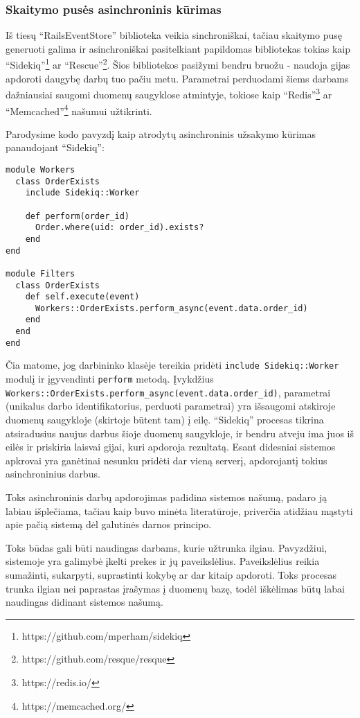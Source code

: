 \subsubsection{Skaitymo pusės asinchroninis kūrimas}

Iš tiesų ``RailsEventStore'' biblioteka veikia sinchroniškai, tačiau skaitymo pusę generuoti galima ir asinchroniškai pasitelkiant papildomas bibliotekas tokias kaip ``Sidekiq''\footnote{https://github.com/mperham/sidekiq} ar ``Rescue''\footnote{https://github.com/resque/resque}. Šios bibliotekos pasižymi bendru bruožu - naudoja gijas apdoroti daugybę darbų tuo pačiu metu. Parametrai perduodami šiems darbams dažniausiai saugomi duomenų saugyklose atmintyje, tokiose kaip ``Redis''\footnote{https://redis.io/} ar ``Memcached''\footnote{https://memcached.org/} našumui užtikrinti.

Parodysime kodo pavyzdį kaip atrodytų asinchroninis užsakymo kūrimas panaudojant ``Sidekiq'':

\begin{lstlisting}
module Workers
  class OrderExists
    include Sidekiq::Worker

    def perform(order_id)
      Order.where(uid: order_id).exists?
    end
end

module Filters
  class OrderExists
    def self.execute(event)
      Workers::OrderExists.perform_async(event.data.order_id)
    end
  end
end
\end{lstlisting}

Čia matome, jog darbininko klasėje tereikia pridėti \lstinline|include Sidekiq::Worker| modulį ir įgyvendinti \lstinline|perform| metodą. Įvykdžius \lstinline|Workers::OrderExists.perform_async(event.data.order_id)|, parametrai (unikalus darbo identifikatorius, perduoti parametrai) yra išsaugomi atskiroje duomenų saugykloje (skirtoje būtent tam) į eilę. ``Sidekiq'' procesas tikrina atsiradusius naujus darbus šioje duomenų saugykloje, ir bendru atveju ima juos iš eilės ir priskiria laisvai gijai, kuri apdoroja rezultatą. Esant didesniai sistemos apkrovai yra ganėtinai nesunku pridėti dar vieną serverį, apdorojantį tokius asinchroninius darbus.

Toks asinchroninis darbų apdorojimas padidina sistemos našumą, padaro ją labiau išplečiama, tačiau kaip buvo minėta literatūroje, priverčia atidžiau mąstyti apie pačią sistemą dėl galutinės darnos principo.

Toks būdas gali būti naudingas darbams, kurie užtrunka ilgiau. Pavyzdžiui, sistemoje yra galimybė įkelti prekes ir jų paveikslėlius. Paveikslėlius reikia sumažinti, sukarpyti, suprastinti kokybę ar dar kitaip apdoroti. Toks procesas trunka ilgiau nei paprastas įrašymas į duomenų bazę, todėl iškėlimas būtų labai naudingas didinant sistemos našumą.

